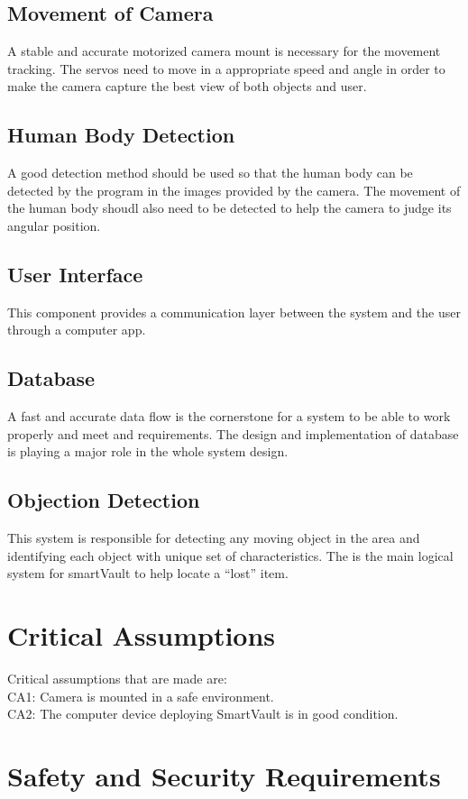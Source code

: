 \documentclass{article}
\begin{document}
\subsection{Movement of Camera}
A stable and accurate motorized camera mount is necessary for the movement tracking. The servos need to move in a appropriate speed and angle in order to make the camera capture the best view of both objects and user.
\subsection{Human Body Detection}
A good detection method should be used so that the human body can be detected by the program in the images provided by the camera. The movement of the human body shoudl also need to be detected to help the camera to judge its angular position.
\subsection{User Interface}
This component provides a communication layer between the system and the user through a computer app.
\subsection{Database}
A fast and accurate data flow is the cornerstone for a system to be able to work properly and meet and requirements. The design and implementation of database is playing a major role in the whole system design.
\subsection{Objection Detection}
This system is responsible for detecting any moving object in the area and identifying each object with unique set of characteristics. The is the main logical system for smartVault to help locate a “lost” item.
\section{Critical Assumptions}
Critical assumptions that are made are: \\
CA1: Camera is mounted in a safe environment. \\
CA2: The computer device deploying SmartVault is in good condition.

\section{Safety and Security Requirements}
\end{document}
